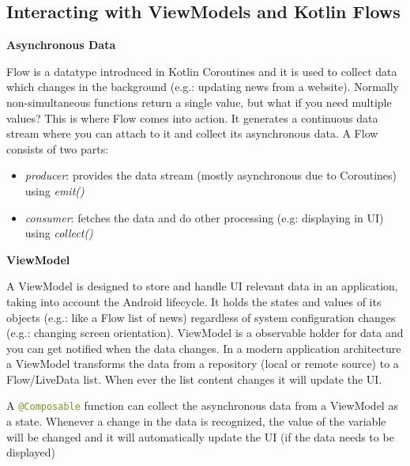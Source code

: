 \subsection{Interacting with ViewModels and Kotlin Flows}
\label{cha:jetpack_interacting}

\noindent
\textbf{Asynchronous Data}

Flow is a datatype introduced in Kotlin Coroutines and it is used to collect data which changes in the background (e.g.: updating news from a website). Normally non-simultaneous functions return a single value, but what if you need multiple values? This is where Flow comes into action. It generates a continuous data stream where you can attach to it and collect its asynchronous data. A Flow consists of two parts\cite{android_flows}:
\begin{itemize}
    \item \textit{producer}: provides the data stream (mostly asynchronous due to Coroutines) using \textit{emit()}
    \item \textit{consumer}: fetches the data and do other processing (e.g: displaying in UI) using \textit{collect()} \\
\end{itemize}

\noindent
\textbf{ViewModel}

A ViewModel is designed to store and handle UI relevant data in an application, taking into account the Android lifecycle. It holds the states and values of its objects (e.g.: like a Flow list of news) regardless of system configuration changes (e.g.: changing screen orientation). ViewModel is a observable holder for data and you can get notified when the data changes. In a modern application architecture a ViewModel transforms the data from a repository (local or remote source) to a Flow/LiveData list. When ever the list content changes it will update the UI.

A \lstinline[language=Kotlin]|@Composable| function can collect the asynchronous data from a ViewModel as a state. Whenever a change in the data is recognized, the value of the variable will be changed and it will automatically update the UI (if the data needs to be displayed)